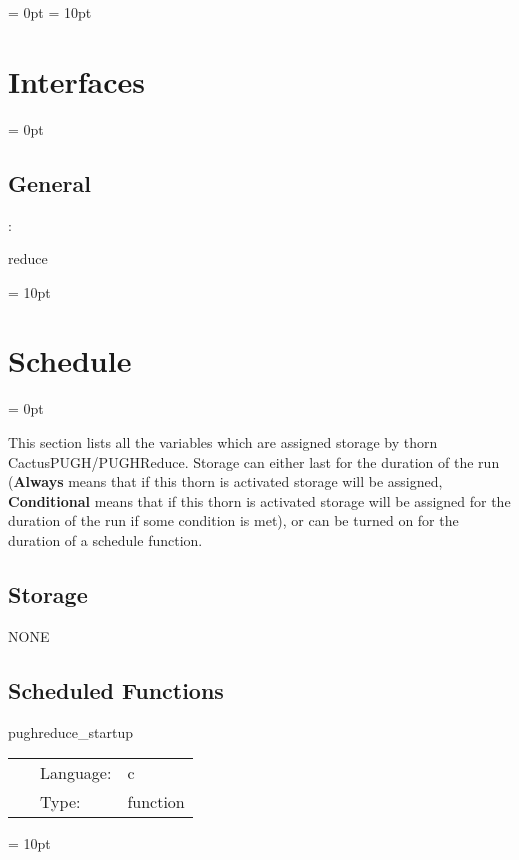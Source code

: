 \documentclass{article}
\begin{document}
\parskip = 0pt
\parskip = 10pt 

\section{Interfaces} 


\parskip = 0pt

\vspace{3mm} \subsection*{General}

: 

reduce
\vspace{2mm}

\vspace{5mm}\parskip = 10pt 

\section{Schedule} 


\parskip = 0pt


\noindent This section lists all the variables which are assigned storage by thorn CactusPUGH/PUGHReduce.  Storage can either last for the duration of the run ({\bf Always} means that if this thorn is activated storage will be assigned, {\bf Conditional} means that if this thorn is activated storage will be assigned for the duration of the run if some condition is met), or can be turned on for the duration of a schedule function.


\subsection*{Storage}NONE
\subsection*{Scheduled Functions}
\vspace{5mm}


\hspace{5mm} pughreduce\_startup 

\hspace{5mm}{\it startup routine } 


\hspace{5mm}

 \begin{tabular*}{160mm}{cll} 
~ & Language:  & c \\ 
~ & Type:  & function \\ 
\end{tabular*} 



\vspace{5mm}\parskip = 10pt 
\end{document}
